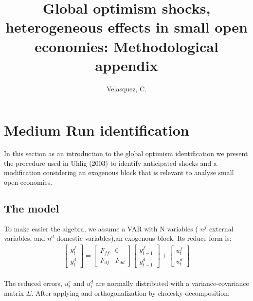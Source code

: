 \documentclass[12pt, a4paper]{article}
\title{\textbf{Global optimism shocks, heterogeneous effects in small open economies: Methodological appendix}}
\author{Velasquez, C.}
\date{}
\begin{document}
\maketitle

\section{Medium Run identification}
In this section as an introduction to the global optimism identification we present the procedure used in Uhlig (2003) to identify anticipated shocks and a modification considering an exogenous block that is relevant to analyse small open economies.
 \subsection{The model}
 To make easier the algebra, we assume a VAR with N variables ( $n^f$ external variables, and $n^d$ domestic variables),an exogenous block. Its reduce form is:
	\begin{equation}
	   \begin{aligned}
	     \left[ \begin{array}{c}  y^{f}_t  \\ y^{d}_t \end{array} \right]
	    =
      	\left[ \begin{array}{cc}  F_{ff} & 0 \\ F_{df} & F_{dd} \end{array} \right]
		\left[ \begin{array}{c}  y^{f}_{t-1}  \\ y^{d}_{t-1}  \end{array} \right]
	 	+
    	\left[ \begin{array}{c}  u^f_{t}  \\ u^d_{t}  \end{array} \right]
	  \end{aligned}
	\end{equation} \\
	The reduced errors, $u^e_{t}$ and $u^d_{t}$ are normally distributed with a variance-covariance matrix $\Sigma$. After applying and orthogonalization by cholesky decomposition:
\end{document}
